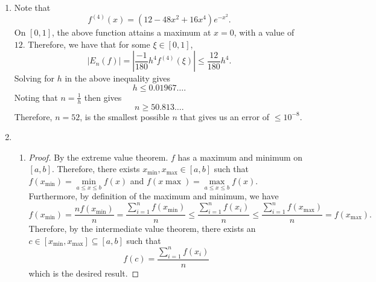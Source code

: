 \documentclass[12pt]{article}
\begin{document}
\begin{enumerate}[leftmargin=2em]
    \item
    Note that
    \[f^{(4)}(x)= (12-48x^2+16x^4)e^{-x^2}.\]
    On $[0,1]$, the above function attains a maximum at $x=0$, with a value of $12$. Therefore, we have that for some $\xi \in [0,1]$,
    \[|E_n(f)|=\left|\frac{-1}{180}h^4f^{(4)}(\xi)\right|\leq \frac{12}{180}h^4.\]
    Solving for $h$ in the above inequality gives 
    \[h\leq 0.01967\ldots.\]
    Noting that $n=\frac{1}{h}$ then gives
    \[n\geq 50.813\ldots.\]
    Therefore, $n=52$, is the smallest possible $n$ that gives us an error of $\leq 10^{-8}$.
    \item
    \begin{enumerate}[leftmargin=!]
        \item 
        \begin{proof}
            By the extreme value theorem. $f$ has a maximum and minimum on $[a,b]$. Therefore, there exists $x_{\min},x_{\max}\in [a,b]$ such that
            $f(x_{\min})= \min\limits_{a\leq x\leq b} f(x)$ and $f(x\max)= \max\limits_{a\leq x\leq b} f(x)$. Furthermore, by definition of the maximum and minimum, we have
            \[f(x_{\min}) = \frac{nf(x_{\min})}{n} = \frac{\sum\limits_{i=1}^{n} f(x_{\min})}{n} \leq \frac{\sum\limits_{i=1}^{n} f(x_{i})}{n} \leq \frac{\sum\limits_{i=1}^{n} f(x_{\max})}{n}= f(x_{\max}).\]
            Therefore, by the intermediate value theorem, there exists an $c \in [x_{\min},x_{\max}]\subseteq [a,b]$ such that 
            \[f(c)= \frac{\sum\limits_{i=1}^{n} f(x_{i})}{n}\]
            which is the desired result.
        \end{proof}


\end{enumerate}
\end{enumerate}
\end{document}
